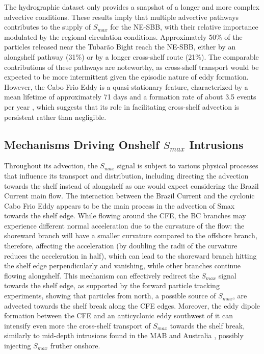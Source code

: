 \documentclass[draft]{agujournal2019}
\begin{document}
The hydrographic dataset only provides a snapshot of a longer and more complex advective conditions. These results imply that multiple advective pathways contributes to the supply of \textit{$S_{max}$} for the NE-SBB, with their relative importance modulated by the regional circulation conditions. Approximately 50\% of the particles released near the Tubarão Bight reach the NE-SBB, either by an alongshelf pathway (31\%) or by a longer cross-shelf route (21\%). The comparable contributions of these pathways are noteworthy, as cross-shelf transport would be expected to be more intermittent given the episodic nature of eddy formation. However, the Cabo Frio Eddy is a quasi-stationary feature, characterized by a mean lifetime of approximately 71 days and a formation rate of about 3.5 events per year \cite{silveira2023}, which suggests that its role in facilitating cross-shelf advection is persistent rather than negligible.

\subsection{Mechanisms Driving Onshelf \textit{$S_{max}$} Intrusions}
\label{subsec:onshelf_mechanisms}

Throughout its advection, the \textit{$S_{max}$} signal is subject to various physical processes that influence its transport and distribution, including directing the advection towards the shelf instead of alongshelf as one would expect considering the Brazil Current main flow. The interaction between the Brazil Current and the cyclonic Cabo Frio Eddy appears to be the main process in the advection of Smax towards the shelf edge. While flowing around the CFE, the BC branches may experience different normal acceleration due to the curvature of the flow: the shoreward branch will have a smaller curvature compared to the offshore branch, therefore, affecting the acceleration (by doubling the radii of the curvature reduces the acceleration in half), which can lead to the shoreward branch hitting the shelf edge perpendicularly and vanishing, while other branches continue flowing alongshelf. This mechanism can effectively redirect the \textit{$S_{max}$} signal towards the shelf edge, as supported by the forward particle tracking experiments, showing that particles from north, a possible source of \textit{$S_{max}$}, are advected towards the shelf break along the CFE edges. Moreover, the eddy dipole formation between the CFE and an anticyclonic eddy southwest of it can intensify even more the cross-shelf transport of \textit{$S_{max}$} towards the shelf break, similarly to mid-depth intrusions found in the MAB \cite{gawarkiewicz2025mapping} and Australia \cite{Malan2020}, possibly injecting \textit{$S_{max}$} fruther onshore.
\end{document}
